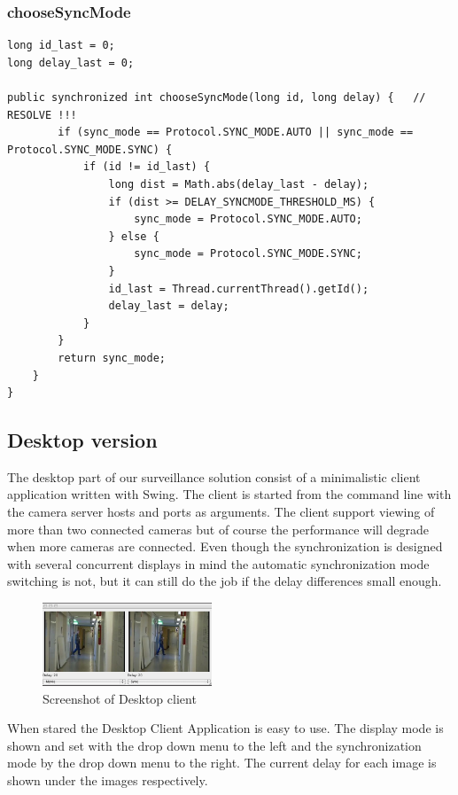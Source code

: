 \documentclass[8pt,titlepage]{article}
\begin{document}
\subsubsection{chooseSyncMode}
\begin{verbatim}
long id_last = 0;
long delay_last = 0;	

public synchronized int chooseSyncMode(long id, long delay) {	// RESOLVE !!!		
		if (sync_mode == Protocol.SYNC_MODE.AUTO || sync_mode == Protocol.SYNC_MODE.SYNC) {
			if (id != id_last) {
				long dist = Math.abs(delay_last - delay);
				if (dist >= DELAY_SYNCMODE_THRESHOLD_MS) {
					sync_mode = Protocol.SYNC_MODE.AUTO;
				} else {
					sync_mode = Protocol.SYNC_MODE.SYNC;
				}
				id_last = Thread.currentThread().getId();
				delay_last = delay;		
			}
		}
		return sync_mode;
	}
}	
\end{verbatim}

\subsection{Desktop version}
The desktop part of our surveillance solution consist of a minimalistic client application written with Swing. The client is started from the command line with the camera server hosts and ports as arguments. The client support viewing of more than two connected cameras but of course the performance will degrade when more cameras are connected. Even though the synchronization is designed with several concurrent displays in mind the automatic synchronization mode switching is not, but it can still do the job if the delay differences small enough.

\begin{figure}[hbp]
\includegraphics[width=0.45\textwidth]{../screenshots/desktopclient.png}
\caption{Screenshot of Desktop client}
\label{desktopclient}
\end{figure}

When stared the Desktop Client Application is easy to use. The display mode is shown and set with the drop down menu to the left and the synchronization mode by the drop down menu to the right. The current delay for each image is shown under the images respectively.
\end{document}
